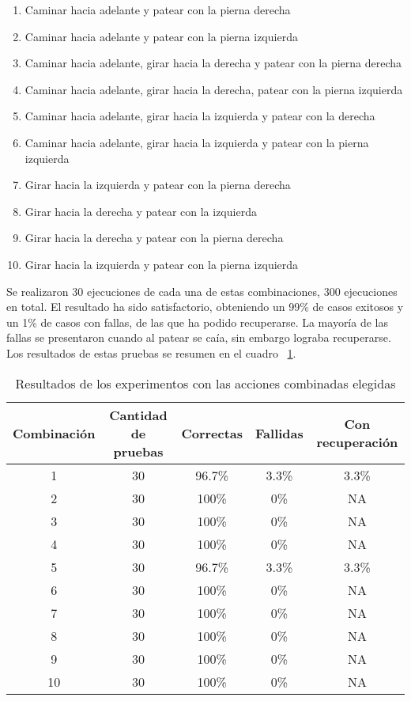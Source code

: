 \begin{enumerate}
\setlength{\itemsep}{0.5pt}
\item Caminar hacia adelante y patear con la pierna derecha 
\item Caminar hacia adelante y patear con la pierna izquierda
\item Caminar hacia adelante, girar hacia la derecha y patear con la pierna derecha
\item Caminar hacia adelante, girar hacia la derecha, patear con la pierna izquierda 
\item Caminar hacia adelante, girar hacia la izquierda y patear con la derecha
\item Caminar hacia adelante, girar hacia la  izquierda y  patear con la pierna izquierda
\item Girar hacia la izquierda y patear con la pierna derecha
\item Girar hacia la derecha y patear con la izquierda
\item Girar hacia la derecha y patear con la pierna derecha
\item Girar hacia la izquierda y patear con la pierna izquierda

\end{enumerate}
Se realizaron 30 ejecuciones de cada una de estas combinaciones, 300 ejecuciones en total. El resultado ha sido satisfactorio, obteniendo un 99\% de casos exitosos y un 1\% de casos con fallas, de las que ha podido recuperarse. La mayoría de las fallas se presentaron cuando al patear se caía, sin embargo lograba recuperarse. Los resultados de estas pruebas se resumen en el cuadro ~\ref{fig:combinadas}.
 
\begin{table}
\centering
\begin{tabular}{c c c c c}
\hline 
Combinaci\'on & Cantidad de pruebas & Correctas & Fallidas & Con recuperaci\'on \\ 
\hline 
1 & 30 & 96.7\% & 3.3\% & 3.3\% \\ 
2 & 30 & 100\% & 0\% & NA \\ 
3 & 30 & 100\% & 0\% & NA \\ 
4 & 30 & 100\% & 0\% & NA \\ 
5 & 30 & 96.7\% & 3.3\% & 3.3\% \\ 
6 & 30 & 100\% & 0\% & NA \\ 
7 & 30 & 100\% & 0\% & NA \\ 
8 & 30 & 100\% & 0\% & NA \\ 
9 & 30 & 100\% & 0\% & NA \\ 
10 & 30 & 100\% & 0\% & NA \\ 
\hline 
\end{tabular} 
\caption{Resultados de los experimentos con las acciones combinadas elegidas}
\label{fig:combinadas}
\end{table}

